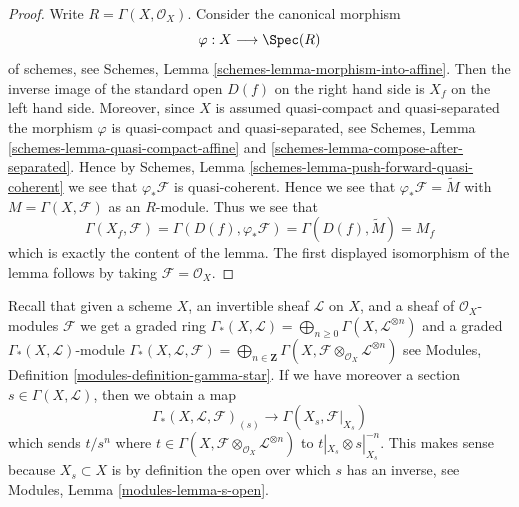 \begin{proof}
Write $R = \Gamma(X, \mathcal{O}_X)$. Consider the canonical morphism
$$
\varphi : X \longrightarrow \Spec(R)
$$
of schemes, see
Schemes, Lemma
\ref{schemes-lemma-morphism-into-affine}.
Then the inverse image of the standard open $D(f)$ on the
right hand side is $X_f$ on the left hand side.
Moreover, since $X$ is assumed quasi-compact and quasi-separated
the morphism $\varphi$ is quasi-compact and quasi-separated,
see Schemes, Lemma \ref{schemes-lemma-quasi-compact-affine} and
\ref{schemes-lemma-compose-after-separated}. Hence by
Schemes, Lemma \ref{schemes-lemma-push-forward-quasi-coherent}
we see that $\varphi_*\mathcal{F}$ is quasi-coherent.
Hence we see that $\varphi_*\mathcal{F} = \widetilde M$
with $M = \Gamma(X, \mathcal{F})$ as an $R$-module.
Thus we see that
$$
\Gamma(X_f, \mathcal{F}) =
\Gamma(D(f), \varphi_*\mathcal{F}) =
\Gamma(D(f), \widetilde M) = M_f
$$
which is exactly the content of the lemma. The first displayed isomorphism
of the lemma follows by taking $\mathcal{F} = \mathcal{O}_X$.
\end{proof}

\noindent
Recall that given a scheme $X$, an invertible sheaf $\mathcal{L}$
on $X$, and a sheaf of $\mathcal{O}_X$-modules $\mathcal{F}$
we get a graded ring
$\Gamma_*(X, \mathcal{L}) =
\bigoplus\nolimits_{n \geq 0} \Gamma(X, \mathcal{L}^{\otimes n})$
and a graded $\Gamma_*(X, \mathcal{L})$-module
$\Gamma_*(X, \mathcal{L}, \mathcal{F}) =
\bigoplus\nolimits_{n \in \mathbf{Z}}
\Gamma(X, \mathcal{F} \otimes_{\mathcal{O}_X} \mathcal{L}^{\otimes n})$
see Modules, Definition \ref{modules-definition-gamma-star}.
If we have moreover a section $s \in \Gamma(X, \mathcal{L})$, then
we obtain a map
\begin{equation}
\label{equation-module-invert-s}
\Gamma_*(X, \mathcal{L}, \mathcal{F})_{(s)}
\longrightarrow
\Gamma(X_s, \mathcal{F}|_{X_s})
\end{equation}
which sends $t/s^n$ where
$t \in \Gamma(X, \mathcal{F} \otimes_{\mathcal{O}_X} \mathcal{L}^{\otimes n})$
to $t|_{X_s} \otimes s|_{X_s}^{-n}$. This makes sense
because $X_s \subset X$ is by definition the open over which
$s$ has an inverse, see Modules, Lemma \ref{modules-lemma-s-open}.

